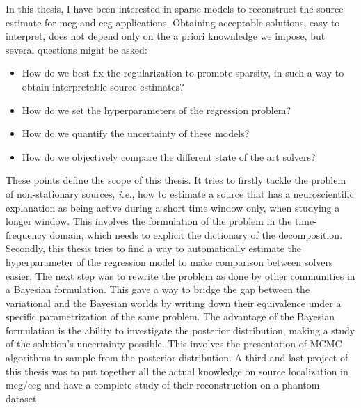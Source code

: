 In this thesis, I have been interested in sparse models to reconstruct the source estimate for \ac{meg} and \ac{eeg} applications. Obtaining acceptable solutions, easy to interpret, does not depend only on the a priori knownledge we impose, but several questions might be asked:
\begin{itemize}
\item How do we best fix the regularization to promote sparsity, in such a way to obtain interpretable source estimates?
\item How do we set the hyperparameters of the regression problem?
\item How do we quantify the uncertainty of these models?
\item How do we objectively compare the different state of the art solvers?
\end{itemize}
These points define the scope of this thesis. It tries to firstly tackle the problem of non-stationary sources, \textit{i.e.}, how to estimate a source that has a neuroscientific explanation as being active during a short time window only, when studying a longer window. This involves the formulation of the problem in the time-frequency domain, which needs to explicit the dictionary of the decomposition. Secondly, this thesis tries to find a way to automatically estimate the hyperparameter of the regression model to make comparison between solvers easier. The next step was to rewrite the problem as done by other communities in a Bayesian formulation. This gave a way to bridge the gap between the variational and the Bayesian worlds by writing down their equivalence under a specific parametrization of the same problem. The advantage of the Bayesian formulation is the ability to investigate the posterior distribution, making a study of the solution's uncertainty possible. This involves the presentation of \ac{MCMC} algorithms to sample from the posterior distribution. A third and last project of this thesis was to put together all the actual knowledge on source localization in \ac{meg}/\ac{eeg} and have a complete study of their reconstruction on a phantom dataset.

